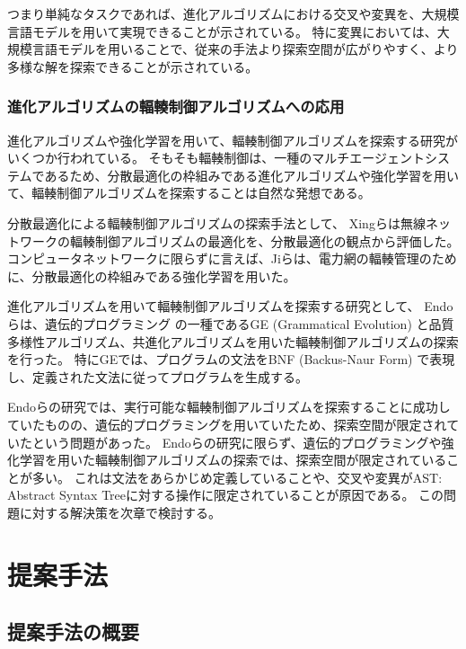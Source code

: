 \documentclass[a4paper,11pt]{jreport}
\begin{document}
つまり単純なタスクであれば、進化アルゴリズムにおける交叉や変異を、大規模言語モデルを用いて実現できることが示されている。
特に変異においては、大規模言語モデルを用いることで、従来の手法より探索空間が広がりやすく、より多様な解を探索できることが示されている。

\subsection{進化アルゴリズムの輻輳制御アルゴリズムへの応用}
\label{subsection:evolutionary-algorithm}

進化アルゴリズムや強化学習を用いて、輻輳制御アルゴリズムを探索する研究がいくつか行われている。
そもそも輻輳制御は、一種のマルチエージェントシステムであるため、分散最適化の枠組みである進化アルゴリズムや強化学習を用いて、輻輳制御アルゴリズムを探索することは自然な発想である。

分散最適化による輻輳制御アルゴリズムの探索手法として、
Xingら\cite{xing2022optimization}は無線ネットワークの輻輳制御アルゴリズムの最適化を、分散最適化の観点から評価した。
コンピュータネットワークに限らずに言えば、Jiら\cite{ji2021distributed}は、電力網の輻輳管理のために、分散最適化の枠組みである強化学習を用いた。

進化アルゴリズムを用いて輻輳制御アルゴリズムを探索する研究として、
Endoら\cite{endo-2022-toward}は、遺伝的プログラミング\cite{holland1992adaptation, gp, gp-foundation}
の一種であるGE (Grammatical Evolution) \cite{grammatical-evolution}
と品質多様性アルゴリズム\cite{quality-diversity}、共進化アルゴリズム\cite{poet, poet-gecco}を用いた輻輳制御アルゴリズムの探索を行った。
特にGEでは、プログラムの文法をBNF (Backus-Naur Form) で表現し、定義された文法に従ってプログラムを生成する。

Endoらの研究では、実行可能な輻輳制御アルゴリズムを探索することに成功していたものの、遺伝的プログラミングを用いていたため、探索空間が限定されていたという問題があった。
Endoらの研究に限らず、遺伝的プログラミングや強化学習を用いた輻輳制御アルゴリズムの探索では、探索空間が限定されていることが多い。
これは文法をあらかじめ定義していることや、交叉や変異がAST: Abstract Syntax Treeに対する操作に限定されていることが原因である。
この問題に対する解決策を次章で検討する。

\newpage

\chapter{提案手法}
\label{chapter:hypothesis}

\section{提案手法の概要}
\end{document}
